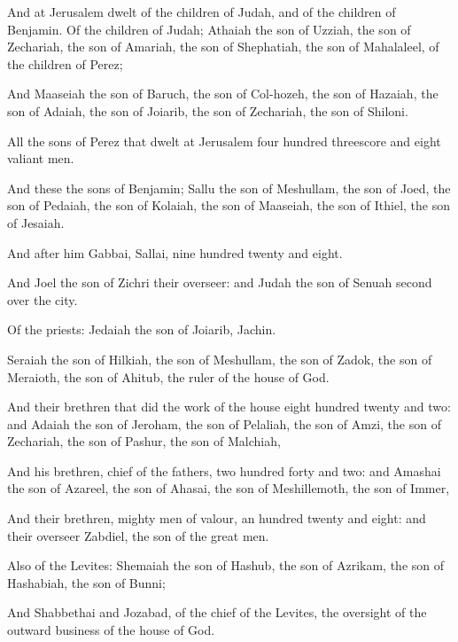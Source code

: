 {And at
Jerusalem
dwelt
{} of the
children of
Judah, and of the
children of
Benjamin. Of the
children of
Judah;
Athaiah the
son of
Uzziah, the
son of
Zechariah, the
son of
Amariah, the
son of
Shephatiah, the
son of
Mahalaleel, of the
children of
Perez;

And
Maaseiah the
son of
Baruch, the
son of
Col-hozeh, the
son of
Hazaiah, the
son of
Adaiah, the
son of
Joiarib, the
son of
Zechariah, the
son of
Shiloni.

All the
sons of
Perez that
dwelt at
Jerusalem
{}
four
hundred
threescore and
eight
valiant
men.

And these
{} the
sons of
Benjamin;
Sallu the
son of
Meshullam, the
son of
Joed, the
son of
Pedaiah, the
son of
Kolaiah, the
son of
Maaseiah, the
son of
Ithiel, the
son of
Jesaiah.

And
after him
Gabbai,
Sallai,
nine
hundred
twenty and
eight.

And
Joel the
son of
Zichri
{} their
overseer: and
Judah the
son of
Senuah
{}
second over the
city.

Of the
priests:
Jedaiah the
son of
Joiarib,
Jachin.

Seraiah the
son of
Hilkiah, the
son of
Meshullam, the
son of
Zadok, the
son of
Meraioth, the
son of
Ahitub,
{} the
ruler of the
house of
God.

And their
brethren that
did the
work of the
house
{}
eight
hundred
twenty and
two: and
Adaiah the
son of
Jeroham, the
son of
Pelaliah, the
son of
Amzi, the
son of
Zechariah, the
son of
Pashur, the
son of
Malchiah,

And his
brethren,
chief of the
fathers,
two
hundred
forty and
two: and
Amashai the
son of
Azareel, the
son of
Ahasai, the
son of
Meshillemoth, the
son of
Immer,

And their
brethren, mighty
men of
valour, an
hundred
twenty and
eight: and their
overseer
{}
Zabdiel, the
son of
{} the great
men.

Also of the
Levites:
Shemaiah the
son of
Hashub, the
son of
Azrikam, the
son of
Hashabiah, the
son of
Bunni;

And
Shabbethai and
Jozabad, of the
chief of the
Levites,
{} the oversight of the
outward
business of the
house of
God.

}
